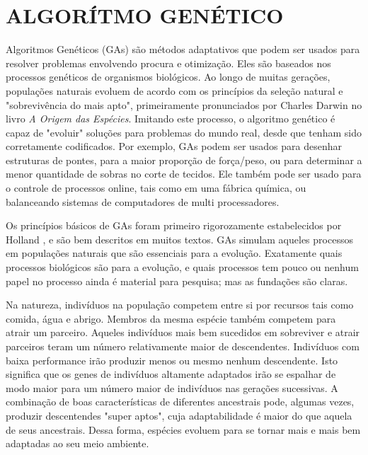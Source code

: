 \chapter[ALGORÍTMO GENÉTICO]{ALGORÍTMO GENÉTICO}

Algoritmos Genéticos (GAs) são métodos adaptativos que podem ser usados para resolver problemas envolvendo procura e otimização. Eles são baseados nos processos genéticos de organismos biológicos. Ao longo de muitas gerações, populações naturais evoluem de acordo com os princípios da seleção natural e "sobrevivência do mais apto", primeiramente pronunciados por Charles Darwin no livro \textit{A Origem das Espécies}. Imitando este processo, o algoritmo genético é capaz de "evoluir" soluções para problemas do mundo real, desde que tenham sido corretamente codificados. Por exemplo, GAs podem ser usados para desenhar estruturas de pontes, para a maior proporção de força/peso, ou para determinar a menor quantidade de sobras no corte de tecidos. Ele também pode ser usado para o controle de processos online, tais como em uma fábrica química, ou balanceando sistemas de computadores de multi processadores. \cite{Beasley1993}

Os princípios básicos de GAs foram primeiro rigorozamente estabelecidos por Holland \cite{Holland1992}, e são bem descritos em muitos textos. GAs simulam aqueles processos em populações naturais que são essenciais para a evolução. Exatamente quais processos biológicos são  para a evolução, e quais processos tem pouco ou nenhum papel no processo ainda é material para pesquisa; mas as fundações são claras.

Na natureza, indivíduos na população competem entre si por recursos tais como comida, água e abrigo. Membros da mesma espécie também competem para atrair um parceiro. Aqueles indivíduos mais bem sucedidos em sobreviver e atrair parceiros teram um número relativamente maior de descendentes. Indivíduos com baixa performance irão produzir menos ou mesmo nenhum descendente. Isto significa que os genes de indivíduos altamente adaptados irão se espalhar de modo maior para um número maior de indivíduos nas gerações sucessivas. A combinação de boas características de diferentes ancestrais pode, algumas vezes, produzir descentendes "super aptos", cuja adaptabilidade é maior do que aquela de seus ancestrais. Dessa forma, espécies evoluem para se tornar mais e mais bem adaptadas ao seu meio ambiente. \cite{Beasley1993}

